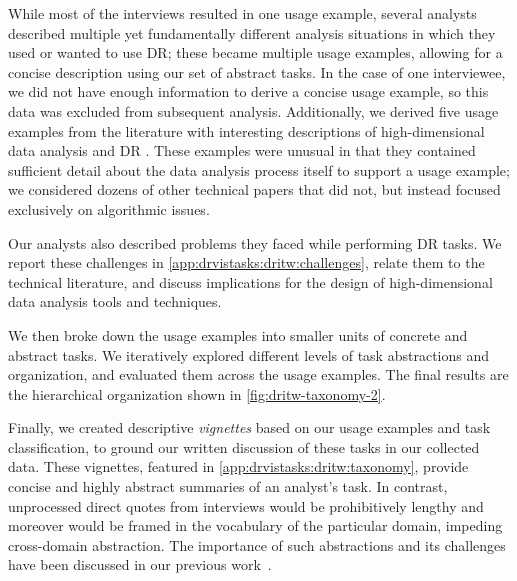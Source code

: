 While most of the interviews resulted in one usage example, several analysts described multiple yet fundamentally different analysis situations in which they used or wanted to use \ac{DR}; these became multiple usage examples, allowing for a concise description using our set of abstract tasks. 
In the case of one interviewee, we did not have enough information to derive a concise usage example, so this data was excluded from subsequent analysis.
Additionally, we derived five usage examples from the literature with interesting descriptions of high-dimensional data analysis and \ac{DR} \cite{Bronstein2006,Buja2002,Matusik2003,Reveret2005,Tenenbaum2000}. 
These examples were unusual in that they contained sufficient detail about the data analysis process itself to support a usage example; we considered dozens of other technical papers that did not, but instead focused exclusively on algorithmic issues. 

Our analysts also described problems they faced while performing \ac{DR} tasks. 
We report these challenges in \autoref{app:drvistasks:dritw:challenges}, relate them to the technical literature, and discuss implications for the design of high-dimensional data analysis tools and techniques. 

We then broke down the usage examples into smaller units of concrete and abstract tasks. 
We iteratively explored different levels of task abstractions and organization, and evaluated them across the usage examples.  
The final results are the hierarchical organization shown in \autoref{fig:dritw-taxonomy-2}.

Finally, we created descriptive {\it vignettes} based on our usage examples and task classification, 
to ground our written discussion of these tasks in our collected data. 
These vignettes, featured in \autoref{app:drvistasks:dritw:taxonomy}, provide concise and highly abstract summaries of an analyst's task. 
In contrast, unprocessed direct quotes from interviews would be prohibitively lengthy and moreover would be framed in the vocabulary of the particular domain, impeding cross-domain abstraction. 
The importance of such abstractions and its challenges have been discussed in our previous work~\cite{Munzner2009,Sedlmair2012}.

